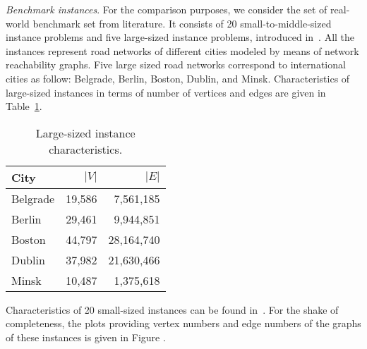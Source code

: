 \documentclass[dvipsnames,format=sigconf,anonymous=true,review=true]{acmart}
\begin{document}
\emph{Benchmark instances}. For the comparison purposes, we consider the set of real-world benchmark set from literature. It consists of 20 small-to-middle-sized instance problems and five large-sized instance problems, introduced in~\cite{corcoran2021heuristics}. All the instances represent road networks of different cities modeled by means of network reachability graphs. Five large sized road  networks correspond to international cities as follow: Belgrade, Berlin, Boston, Dublin, and Minsk.  Characteristics of large-sized instances in terms of number of vertices and edges are given in Table~\ref{tab:big_instances_chars}.  
 
 \begin{table}
 	\caption{Large-sized instance characteristics.}
 	\label{tab:big_instances_chars}  
 	\begin{tabular}{lrr}
 		City      & $|V|$ & $|E|$ \\ \hline
 		Belgrade      & 19,586 & 7,561,185  \\ 
 		Berlin        & 29,461 & 9,944,851 \\
 	    Boston        & 44,797 & 28,164,740 \\
 	    Dublin        & 37,982 & 21,630,466 \\
 	    Minsk         & 10,487 & 1,375,618 \\ \hline
 	\end{tabular}
 \end{table}
 
 Characteristics of 20 small-sized instances can be found in~\cite{corcoran2021heuristics}. For the shake of completeness, the plots providing vertex numbers and edge numbers of the graphs of these instances is given in Figure .  
 
\end{document}
